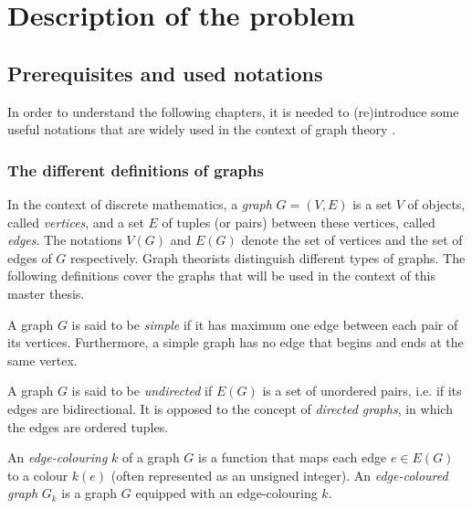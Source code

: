 \setcounter{secnumdepth}{2}

\chapter{Description of the problem}

\section{Prerequisites and used notations}

In order to understand the following chapters, it is needed to (re)introduce some useful notations that are widely used in the context of graph theory \cite{graphtheory}.


\subsection{The different definitions of graphs}

In the context of discrete mathematics, a \textit{graph} $G = (V, E)$ is a set $V$ of objects, called \textit{vertices}, and a set $E$ of tuples (or pairs) between these vertices, called \textit{edges}. The notations $V(G)$ and $E(G)$ denote the set of vertices and the set of edges of $G$ respectively. Graph theorists distinguish different types of graphs. The following definitions cover the graphs that will be used in the context of this master thesis.

\begin{definition}
    \label{def:simple_graph}
    A graph $G$ is said to be \textit{simple} if it has maximum one edge between each pair of its vertices. Furthermore, a simple graph has no edge that begins and ends at the same vertex.
\end{definition}

\begin{definition}
    \label{def:undirected_graph}
    A graph $G$ is said to be \textit{undirected} if $E(G)$ is a set of unordered pairs, i.e. if its edges are bidirectional. It is opposed to the concept of \textit{directed graphs}, in which the edges are ordered tuples.
\end{definition}

\begin{definition}
    \label{def:edge_coloured_graph}
    An \textit{edge-colouring} $k$ of a graph $G$ is a function that maps each edge $e \in E(G)$ to a colour $k(e)$ (often represented as an unsigned integer). An \textit{edge-coloured graph} $G_k$ is a graph $G$ equipped with an edge-colouring $k$.
\end{definition}

